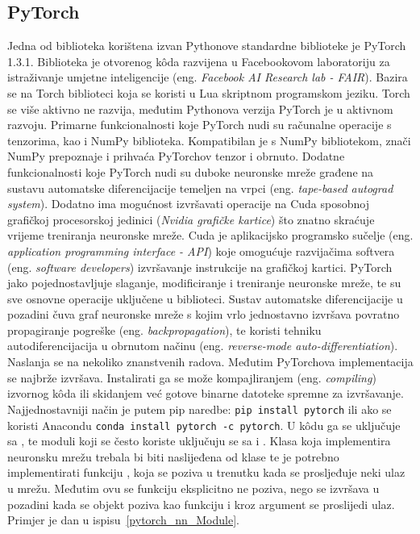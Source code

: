 \subsection{PyTorch}
Jedna od biblioteka korištena izvan Pythonove standardne biblioteke je PyTorch 1.3.1. Biblioteka je otvorenog k\^oda razvijena u Facebookovom laboratoriju za istraživanje umjetne inteligencije  (eng. \textit{Facebook AI Research lab - FAIR}). Bazira se na Torch biblioteci koja se koristi u Lua skriptnom programskom jeziku. Torch se više aktivno ne razvija, međutim Pythonova verzija PyTorch je u aktivnom razvoju. Primarne funkcionalnosti koje PyTorch nudi su računalne operacije s tenzorima, kao i NumPy biblioteka. Kompatibilan je s NumPy bibliotekom, znači NumPy prepoznaje i prihvaća PyTorchov tenzor i obrnuto. Dodatne funkcionalnosti koje PyTorch nudi su duboke neuronske mreže građene na sustavu automatske diferencijacije temeljen na vrpci (eng. \textit{tape-based autograd system}). Dodatno ima mogućnost izvršavati operacije na Cuda sposobnoj grafičkoj procesorskoj jedinici (\emph{Nvidia grafičke kartice}) što znatno skraćuje vrijeme treniranja neuronske mreže. Cuda je aplikacijsko programsko sučelje (eng. \textit{application programming interface - API}) koje omogućuje razvijačima softvera (eng. \textit{software developers}) izvršavanje instrukcije na grafičkoj kartici. PyTorch jako pojednostavljuje slaganje, modificiranje i treniranje neuronske mreže, te su sve osnovne operacije uključene u biblioteci. Sustav automatske diferencijacije u pozadini čuva graf neuronske mreže s kojim vrlo jednostavno izvršava povratno propagiranje pogreške (eng. \textit{backpropagation}), te koristi tehniku autodiferencijacija u obrnutom načinu (eng. \textit{reverse-mode auto-differentiation}). Naslanja se na nekoliko znanstvenih radova. Međutim PyTorchova implementacija se najbrže izvršava. Instalirati ga se može kompajliranjem (eng. \textit{compiling}) izvornog k\^oda ili skidanjem već gotove binarne datoteke spremne za izvršavanje. Najjednostavniji način je putem pip naredbe: \lstinline$pip install pytorch$ ili ako se koristi Anacondu \lstinline$conda install pytorch -c pytorch$. U k\^odu ga se uključuje sa , te moduli koji se često koriste uključuju se sa  i . Klasa koja implementira neuronsku mrežu trebala bi biti naslijeđena od klase  te je potrebno implementirati funkciju , koja se poziva u trenutku kada se prosljeđuje neki ulaz u mrežu. Međutim ovu se funkciju eksplicitno ne poziva, nego se izvršava u pozadini kada se objekt poziva kao funkciju i kroz argument se proslijedi ulaz. Primjer je dan u ispisu~\ref{pytorch_nn_Module}.
{}

